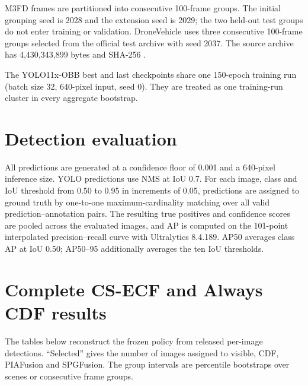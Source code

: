 \documentclass[11pt]{article}
\begin{document}
M3FD frames are partitioned into consecutive 100-frame groups. The initial
grouping seed is 2028 and the extension seed is 2029; the two held-out test
groups do not enter training or validation. DroneVehicle uses three consecutive
100-frame groups selected from the official test archive with seed 2037. The
source archive has 4,430,343,899 bytes and SHA-256
\texttt{}.

The YOLO11x-OBB best and last checkpoints share one 150-epoch training run
(batch size 32, 640-pixel input, seed 0). They are treated as one training-run
cluster in every aggregate bootstrap.

\section{Detection evaluation}

All predictions are generated at a confidence floor of 0.001 and a 640-pixel
inference size. YOLO predictions use NMS at IoU 0.7. For each image, class and
IoU threshold from 0.50 to 0.95 in increments of 0.05, predictions are assigned
to ground truth by one-to-one maximum-cardinality matching over all valid
prediction--annotation pairs. The resulting true positives and confidence
scores are pooled across the evaluated images, and AP is computed on the
101-point interpolated precision--recall curve with Ultralytics 8.4.189.
AP50 averages class AP at IoU 0.50; AP50--95 additionally averages the ten IoU
thresholds.

\section{Complete CS-ECF and Always CDF results}

The tables below reconstruct the frozen policy from released per-image
detections. ``Selected'' gives the number of images assigned to visible, CDF,
PIAFusion and SPGFusion. The group intervals are percentile bootstraps over
scenes or consecutive frame groups.
\end{document}
